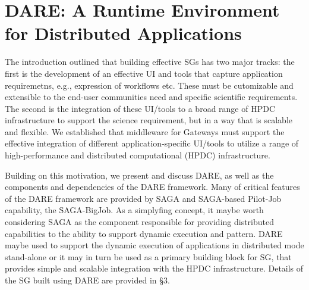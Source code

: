\documentclass[]{svjour3}
\begin{document}




\section{DARE: A Runtime Environment for Distributed Applications}

The introduction outlined that building effective SGs has two major
tracks: the first is the development of an effective UI and tools that
capture application requiremetns, e.g., expression of workflows etc.
These must be cutomizable and extensible to the end-user communities
need and specific scientific requirements. The second is the
integration of these UI/tools to a broad range of HPDC infrastructure
to support the science requirement, but in a way that is scalable and
flexible. We established that middleware for Gateways must support the
effective integration of different application-specific UI/tools to
utilize a range of high-performance and distributed computational
(HPDC) infrastructure.

Building on this motivation, we present and discuss DARE, as well as
the components and dependencies of the DARE framework.  Many of
critical features of the DARE framework are provided by SAGA and
SAGA-based Pilot-Job capability, the SAGA-BigJob\cite{saga-ccgrid10}.
As a simplyfing concept, it maybe worth considering SAGA as the
component responsible for providing distributed capabilities to the
ability to support dynamic execution and pattern.  DARE maybe used to
support the dynamic execution of applications in distributed mode
stand-alone or it may in turn be used as a primary building block for
SG, that provides simple and scalable integration with the HPDC
infrastructure. Details of the SG built using DARE are provided in
\S3.
\end{document}
